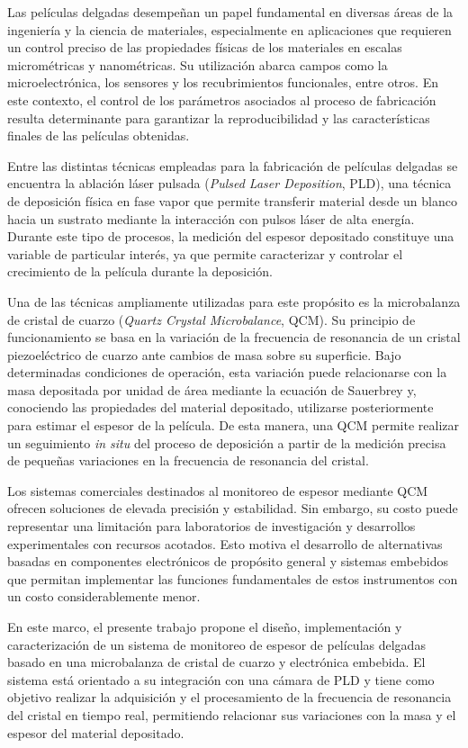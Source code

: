 \documentclass{article}
\begin{document}
Las películas delgadas desempeñan un papel fundamental en diversas áreas de la ingeniería y la ciencia de materiales, especialmente en aplicaciones que requieren un control preciso de las propiedades físicas de los materiales en escalas micrométricas y nanométricas. Su utilización abarca campos como la microelectrónica, los sensores y los recubrimientos funcionales, entre otros. En este contexto, el control de los parámetros asociados al proceso de fabricación resulta determinante para garantizar la reproducibilidad y las características finales de las películas obtenidas.

Entre las distintas técnicas empleadas para la fabricación de películas delgadas se encuentra la ablación láser pulsada (\textit{Pulsed Laser Deposition}, PLD), una técnica de deposición física en fase vapor que permite transferir material desde un blanco hacia un sustrato mediante la interacción con pulsos láser de alta energía. Durante este tipo de procesos, la medición del espesor depositado constituye una variable de particular interés, ya que permite caracterizar y controlar el crecimiento de la película durante la deposición.

Una de las técnicas ampliamente utilizadas para este propósito es la microbalanza de cristal de cuarzo (\textit{Quartz Crystal Microbalance}, QCM). Su principio de funcionamiento se basa en la variación de la frecuencia de resonancia de un cristal piezoeléctrico de cuarzo ante cambios de masa sobre su superficie. Bajo determinadas condiciones de operación, esta variación puede relacionarse con la masa depositada por unidad de área mediante la ecuación de Sauerbrey y, conociendo las propiedades del material depositado, utilizarse posteriormente para estimar el espesor de la película. De esta manera, una QCM permite realizar un seguimiento \textit{in situ} del proceso de deposición a partir de la medición precisa de pequeñas variaciones en la frecuencia de resonancia del cristal.

Los sistemas comerciales destinados al monitoreo de espesor mediante QCM ofrecen soluciones de elevada precisión y estabilidad. Sin embargo, su costo puede representar una limitación para laboratorios de investigación y desarrollos experimentales con recursos acotados. Esto motiva el desarrollo de alternativas basadas en componentes electrónicos de propósito general y sistemas embebidos que permitan implementar las funciones fundamentales de estos instrumentos con un costo considerablemente menor.

En este marco, el presente trabajo propone el diseño, implementación y caracterización de un sistema de monitoreo de espesor de películas delgadas basado en una microbalanza de cristal de cuarzo y electrónica embebida. El sistema está orientado a su integración con una cámara de PLD y tiene como objetivo realizar la adquisición y el procesamiento de la frecuencia de resonancia del cristal en tiempo real, permitiendo relacionar sus variaciones con la masa y el espesor del material depositado.
\end{document}
